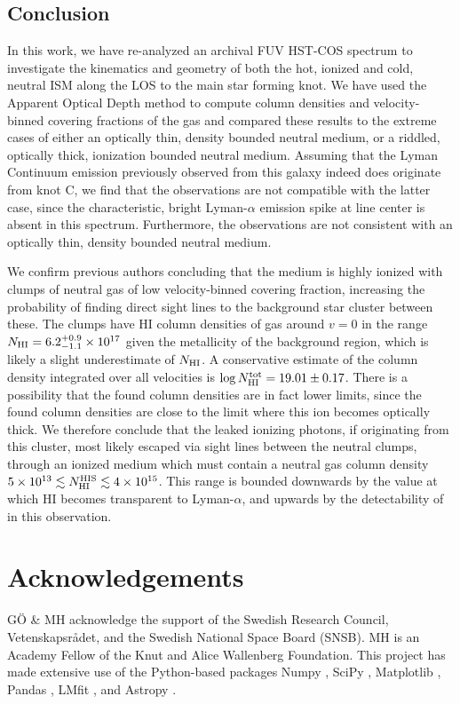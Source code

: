 \documentclass[twocolumn]{aastex61}
\begin{document}
\subsection{Conclusion}\label{conclusion}

In this work, we have re-analyzed an archival FUV HST-COS spectrum to
investigate the kinematics and geometry of both the hot, ionized and
cold, neutral ISM along the LOS to the main star forming knot. We have
used the Apparent Optical Depth method to compute column densities and
velocity-binned covering fractions of the gas and compared these results
to the extreme cases of either an optically thin, density bounded
neutral medium, or a riddled, optically thick, ionization bounded
neutral medium. Assuming that the Lyman Continuum emission previously
observed from this galaxy indeed does originate from knot C, we find
that the observations are not compatible with the latter case, since the
characteristic, bright Lyman-$\alpha$ emission spike at line center is
absent in this spectrum. Furthermore, the observations are not
consistent with an optically thin, density bounded neutral medium.

We confirm previous authors concluding that the medium is highly ionized
with clumps of neutral gas of low velocity-binned covering fraction,
increasing the probability of finding direct sight lines to the
background star cluster between these. The clumps have HI column
densities of gas around $v=0$ in the range
$N_{\rm HI} = 6.2^{+0.9}_{-1.1} \times 10^{17}$ given the metallicity of
the background  region, which is likely a slight underestimate
of $N_{\rm HI}$. A conservative estimate of the  column
density integrated over all velocities is
$\log N_{\rm H I}^{\rm tot} = 19.01 \pm 0.17$. There is a possibility
that the found column densities are in fact lower limits, since the
found  column densities are close to the limit where this ion
becomes optically thick. We therefore conclude that the leaked ionizing
photons, if originating from this cluster, most likely escaped via sight
lines between the neutral clumps, through an ionized medium which must
contain a neutral gas column density
$5 \times 10^{13} \lesssim N_{\rm HI}^{\rm HIS} \lesssim 4 \times 10^{15}$.
This range is bounded downwards by the value at which HI becomes
transparent to Lyman-$\alpha$, and upwards by the detectability of
 in this observation.

\section*{Acknowledgements}\label{acknowledgements}

GÖ \& MH acknowledge the support of the Swedish Research Council,
Vetenskapsrådet, and the Swedish National Space Board (SNSB). MH is an
Academy Fellow of the Knut and Alice Wallenberg Foundation. This project
has made extensive use of the Python-based packages Numpy \citep{Numpy},
SciPy \citep{SciPy}, Matplotlib \citep{Matplotlib}, Pandas
\citep{Pandas}, LMfit \citep{lmfit2014}, and Astropy
\citep{Astropy2013}.


\end{document}
